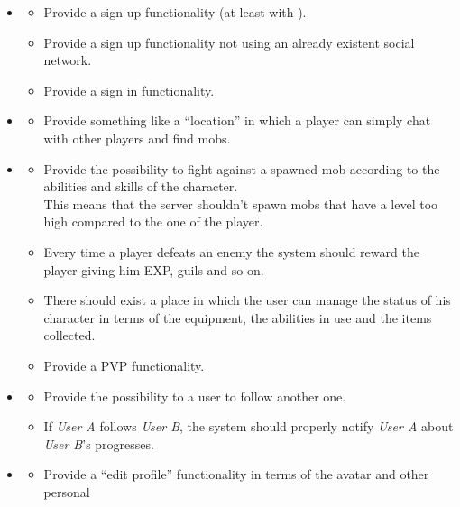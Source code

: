 	\begin{itemize}
		\item \textbf{\goalSignup}
			\begin{itemize}
				\item Provide a sign up functionality (at least with \Facebook{}).
				\item Provide a sign up functionality not using an already existent social network.
				\item Provide a sign in functionality.
			\end{itemize}
		\item \textbf{\goalExplore}
			\begin{itemize}
				\item Provide something like a ``location'' in which a player can simply chat with 
				other players and find mobs.
			\end{itemize}
		\item \textbf{\goalSkill}
			\begin{itemize}
				\item Provide the possibility to fight against a spawned mob according to the abilities and 
				skills of the character.\\
				This means that the server shouldn't spawn mobs that have a level too high compared to the one 
				of the player.
				\item Every time a player defeats an enemy the system should reward the player giving him 
				EXP, guils and so on.
				\item There should exist a place in which the user can manage the status of his character in terms of 
				the equipment, the abilities in use and the items collected.
				\item Provide a PVP functionality.
			\end{itemize}
		\item \textbf{\goalFollow}
			\begin{itemize}
				\item Provide the possibility to a user to follow another one.
				\item If \textit{User A} follows \textit{User B}, the system should properly notify 
				\textit{User A} about \textit{User B}'s progresses.
			\end{itemize}
		\item \textbf{\goalProfile}
			\begin{itemize}
				\item Provide a ``edit profile'' functionality in terms of the avatar and other personal 

\end{itemize}
\end{itemize}
